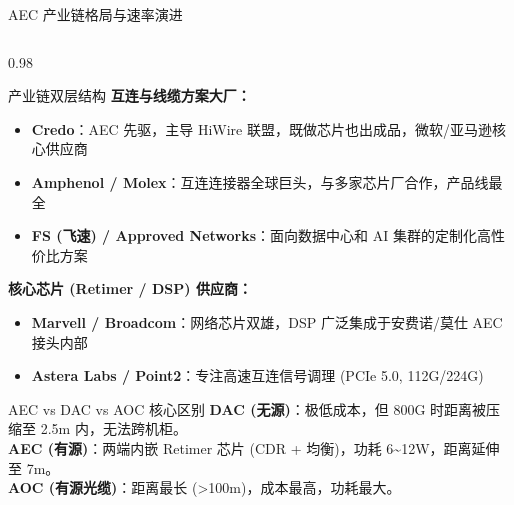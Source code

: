 \documentclass[aspectratio=169, 10pt, UTF8]{ctexbeamer}
\begin{document}
\begin{frame}{AEC 产业链格局与速率演进}
  \centering
  \begin{columns}[T]
    \begin{column}{0.98\textwidth}
      \begin{block}{产业链双层结构}
        \textbf{互连与线缆方案大厂：}
        \begin{itemize}
          \item \textbf{Credo}：AEC 先驱，主导 HiWire 联盟，既做芯片也出成品，微软/亚马逊核心供应商
          \item \textbf{Amphenol / Molex}：互连连接器全球巨头，与多家芯片厂合作，产品线最全
          \item \textbf{FS (飞速) / Approved Networks}：面向数据中心和 AI 集群的定制化高性价比方案
        \end{itemize}
        \vspace{4pt}
        \textbf{核心芯片 (Retimer / DSP) 供应商：}
        \begin{itemize}
          \item \textbf{Marvell / Broadcom}：网络芯片双雄，DSP 广泛集成于安费诺/莫仕 AEC 接头内部
          \item \textbf{Astera Labs / Point2}：专注高速互连信号调理 (PCIe 5.0, 112G/224G)
        \end{itemize}
      \end{block}
      \begin{alertblock}{AEC vs DAC vs AOC 核心区别}
        \textbf{DAC (无源)}：极低成本，但 800G 时距离被压缩至 2.5m 内，无法跨机柜。\\
        \textbf{AEC (有源)}：两端内嵌 Retimer 芯片 (CDR + 均衡)，功耗 6{\textasciitilde}12W，距离延伸至 7m。\\
        \textbf{AOC (有源光缆)}：距离最长 (>100m)，成本最高，功耗最大。
      \end{alertblock}
    \end{column}
  \end{columns}

\end{frame}
\end{document}
